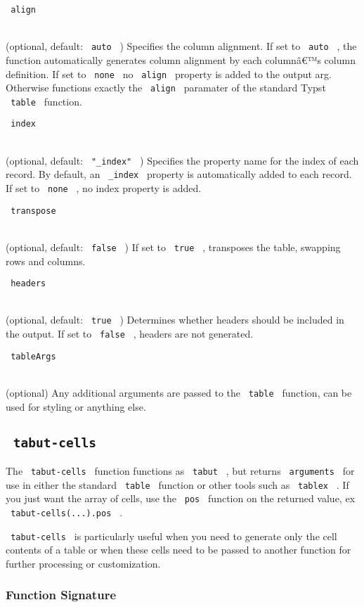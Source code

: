 \texttt{\ align\ }\strut \\
(optional, default: \texttt{\ auto\ } ) Specifies the column alignment.
If set to \texttt{\ auto\ } , the function automatically generates
column alignment by each columnâ€™s column definition. If set to
\texttt{\ none\ } no \texttt{\ align\ } property is added to the output
arg. Otherwise functions exactly the \texttt{\ align\ } paramater of the
standard Typst \texttt{\ table\ } function.

\texttt{\ index\ }\strut \\
(optional, default: \texttt{\ "\_index"\ } ) Specifies the property name
for the index of each record. By default, an \texttt{\ \_index\ }
property is automatically added to each record. If set to
\texttt{\ none\ } , no index property is added.

\texttt{\ transpose\ }\strut \\
(optional, default: \texttt{\ false\ } ) If set to \texttt{\ true\ } ,
transposes the table, swapping rows and columns.

\texttt{\ headers\ }\strut \\
(optional, default: \texttt{\ true\ } ) Determines whether headers
should be included in the output. If set to \texttt{\ false\ } , headers
are not generated.

\texttt{\ tableArgs\ }\strut \\
(optional) Any additional arguments are passed to the \texttt{\ table\ }
function, can be used for styling or anything else.

\subsection[\texttt{\ tabut-cells\ }
]{\texorpdfstring{\texttt{\ tabut-cells\ }
\protect\hypertarget{tabut-cells}{}{
}}{ tabut-cells   }}\label{tabut-cells}

The \texttt{\ tabut-cells\ } function functions as \texttt{\ tabut\ } ,
but returns \texttt{\ arguments\ } for use in either the standard
\texttt{\ table\ } function or other tools such as \texttt{\ tablex\ } .
If you just want the array of cells, use the \texttt{\ pos\ } function
on the returned value, ex \texttt{\ tabut-cells(...).pos\ } .

\texttt{\ tabut-cells\ } is particularly useful when you need to
generate only the cell contents of a table or when these cells need to
be passed to another function for further processing or customization.

\subsubsection{Function Signature}\label{function-signature}

